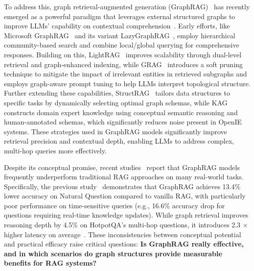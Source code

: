 \documentclass{article} %
\begin{document}
 To address this, graph retrieval-augmented generation (GraphRAG)~\citep{zhang2025survey,peng2024graph,procko2024graph} has recently emerged as a powerful paradigm that leverages external structured graphs to improve LLMs' capability on contextual comprehension~\citep{han2024retrieval,zhang2025survey}. Early efforts, like Microsoft GraphRAG~\citep{edge2024local} and its variant LazyGraphRAG~\citep{LazyGraphRAG}, employ hierarchical community-based search and combine local/global querying for comprehensive responses. Building on this, LightRAG~\citep{guo2024lightrag} improves scalability through dual-level retrieval and graph-enhanced indexing, while GRAG~\citep{hu2024grag} introduces a soft pruning technique to mitigate the impact of irrelevant entities in retrieved subgraphs and employs graph-aware prompt tuning to help LLMs interpret topological structure. Further extending these capabilities, StructRAG~\citep{li2024structrag} tailors data structures to specific tasks by dynamically selecting optimal graph schemas, while KAG~\citep{liang2024kag} constructs domain expert knowledge using conceptual semantic reasoning and human-annotated schemas, which significantly reduces noise present in OpenIE systems. These strategies used in GraphRAG models significantly improve retrieval precision and contextual depth, enabling LLMs to address complex, multi-hop queries more effectively.
 
 Despite its conceptual promise, recent studies~\citep{han2025rag,zhou2025depth} report that GraphRAG models frequently underperform traditional RAG approaches on many real-world tasks. Specifically, the previous study~\citep{han2025rag} demonstrates that GraphRAG achieves 13.4\% lower accuracy on Natural Question compared to vanilla RAG, with particularly poor performance on time-sensitive queries (e.g., 16.6\% accuracy drop for questions requiring real-time knowledge updates). While graph retrieval improves reasoning depth by 4.5\% on HotpotQA’s multi-hop questions, it introduces 2.3 × higher latency on average~\citep{zhou2025depth}. These inconsistencies between conceptual potential and practical efficacy raise critical questions: \textbf{Is GraphRAG really effective, and in which scenarios do graph structures provide measurable benefits for RAG systems?}
\end{document}
